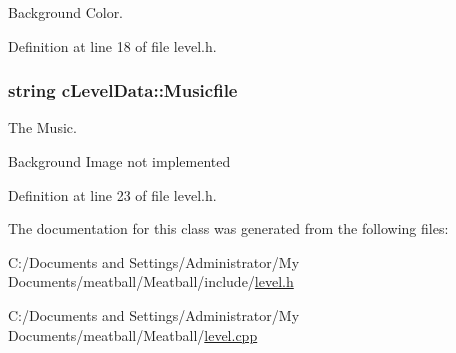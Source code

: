 Background Color. 



Definition at line 18 of file level.\-h.

\hypertarget{classc_level_data_ac2a28344b83ea2d8c093d8f0d4552d2b}{
\subsubsection[{Musicfile}]{\setlength{\rightskip}{0pt plus 5cm}string c\-Level\-Data\-::\-Musicfile}}\label{classc_level_data_ac2a28344b83ea2d8c093d8f0d4552d2b}


The Music. 

Background Image not implemented 

Definition at line 23 of file level.\-h.



The documentation for this class was generated from the following files\-:\begin{DoxyCompactItemize}
\item 
C\-:/\-Documents and Settings/\-Administrator/\-My Documents/meatball/\-Meatball/include/\hyperlink{level_8h}{level.\-h}\item 
C\-:/\-Documents and Settings/\-Administrator/\-My Documents/meatball/\-Meatball/\hyperlink{level_8cpp}{level.\-cpp}\end{DoxyCompactItemize}
